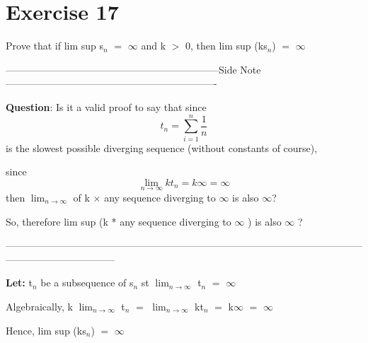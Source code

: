 \documentclass{article}
\newcommand{\mt}[1]{\ensuremath{#1}}
\newcommand\bsc[2][\DefaultOpt]{%
  \def\DefaultOpt{#2}%
  \section[#1]{#2}%
}
\newcommand{\lt}[1]{\textbf{Let: } #1}
\newcommand{\sidenote}[1]{-----------------------------------------------------------------Side Note----------------------------------------------------------------
#1 \

---------------------------------------------------------------------------------------------------------------------------------------------}
\newcommand{\gr}{\mt{>} }
\newcommand{\eql}{\mt{=} }
\newcommand{\uw}[2]{#1\mt{_{#2}}}
\newcommand{\lmti}[1]{\mt{\displaystyle{\lim_{#1 \to \infty}}}}
\newcommand{\eqn}[1]{\[#1\]}
\newcommand{\infy}{\mt{\infty} }
\begin{document}
\bsc{Exercise 17}{

Prove that if lim sup \uw{s}{n} \eql \infy and k \gr 0, then lim sup (k\uw{s}{n}) \eql \infy

\sidenote{
\textbf{Question}: Is it a valid proof to say that since
\eqn{t_n = \sum_{i = 1}^n \frac{1}{n}}
is the slowest possible diverging sequence (without constants of course),

since
\eqn{\lmti{n} kt_n = k \infty = \infty}
then \lmti{n} of k $\times$ any sequence diverging to \infy is also $\infty$?

So, therefore lim sup (k * any sequence diverging to \infy) is also \infy?
}

\lt{\uw{t}{n} be a subsequence of \uw{s}{n} st \lmti{n} \uw{t}{n} \eql \infy}

Algebraically, k \lmti{n} \uw{t}{n} \eql \lmti{n} k\uw{t}{n} \eql k\infy \eql \infy

Hence, lim sup (k\uw{s}{n}) \eql \infy


}
\end{document}
